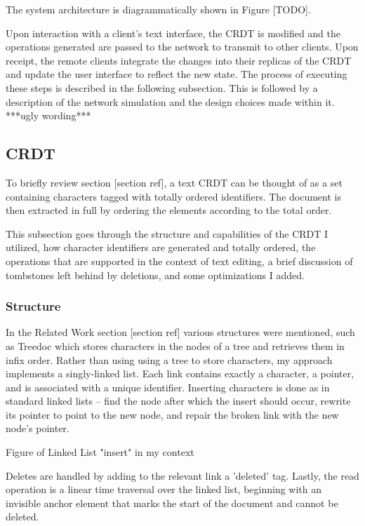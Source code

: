 \documentclass[12pt,a4paper,twoside,openright]{report}
\begin{document}
	The system architecture is diagrammatically shown in Figure [TODO].
	
	Upon interaction with a client's text interface, the CRDT is modified and the operations generated are passed to the network to transmit to other clients. Upon receipt, the remote clients integrate the changes into their replicas of the CRDT and update the user interface to reflect the new state. The process of executing these steps is described in the following subsection. This is followed by a description of the network simulation and the design choices made within it.  ***ugly wording***
	
	
	\subsection{CRDT}
		To briefly review section [section ref], a text CRDT can be thought of as a set containing characters tagged with totally ordered identifiers. The document is then extracted in full by ordering the elements according to the total order. 
		
		This subsection goes through the structure and capabilities of the CRDT I utilized, how character identifiers are generated and totally ordered, the operations that are supported in the context of text editing, a brief discussion of tombstones left behind by deletions, and some optimizations I added.
		
		\subsubsection{Structure}
		In the Related Work section [section ref] various structures were mentioned, such as Treedoc which stores characters in the nodes of a tree and retrieves them in infix order. Rather than using using a tree to store characters, my approach implements a singly-linked list. Each link contains exactly a character, a pointer, and is associated with a unique identifier.  Inserting characters is done as in standard linked lists -- find the node after which the insert should occur, rewrite its pointer to point to the new node, and repair the broken link with the new node's pointer.
		
		Figure of Linked List "insert" in my context
		
		Deletes are handled by adding to the relevant link a 'deleted' tag. Lastly, the read operation is a linear time traversal over the linked list, beginning with an invisible anchor element that marks the start of the document and cannot be deleted.
		
\end{document}

